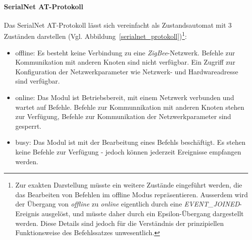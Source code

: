             \paragraph{SerialNet AT-Protokoll}


                Das SerialNet AT-Protokoll lässt sich vereinfacht als Zustandsautomat mit 3 Zuständen darstellen
                (Vgl. Abbildung~\ref{serialnet_protokoll})\footnote{Zur exakten Darstellung müsste ein weitere 
                    Zustände eingeführt werden, die das Bearbeiten von Befehlen im offline Modus repräsentieren. 
                    Ausserdem wird der Übergang von \emph{offline} zu \emph{online} eigentlich durch eine 
                    \emph{EVENT\_JOINED}-Ereignis ausgelöst, und müsste daher durch ein Epsilon-Übergang dargestellt
                    werden. Diese Details sind jedoch für die Verständnis der prinzipiellen Funktionsweise des 
                    Befehlssatzes unwesentlich.}:

                \begin{itemize}
                    \item{offline:} Es besteht keine Verbindung zu eine \emph{ZigBee}-Netzwerk. Befehle
                                    zur Kommunikation mit anderen Knoten sind nicht verfügbar. 
                                    Ein Zugriff zur Konfiguration der Netzwerkparameter wie 
                                    Netzwerk- und Hardwareadresse sind verfügbar. 

                    \item{online:} Das Modul ist Betriebsbereit, mit einem Netzwerk verbunden und wartet
                                   auf Befehle. Befehle zur Kommunnikation mit anderen Knoten stehen zur
                                   Verfügung, Befehle zur Kommunikation der Netzwerkparameter sind gesperrt.

                    \item{busy:} Das Modul ist mit der Bearbeitung eines Befehls beschäftigt. Es stehen
                                 keine Befehle zur Verfügung - jedoch können jederzeit Ereignisse 
                                 empfangen werden.
                \end{itemize}
                                    
